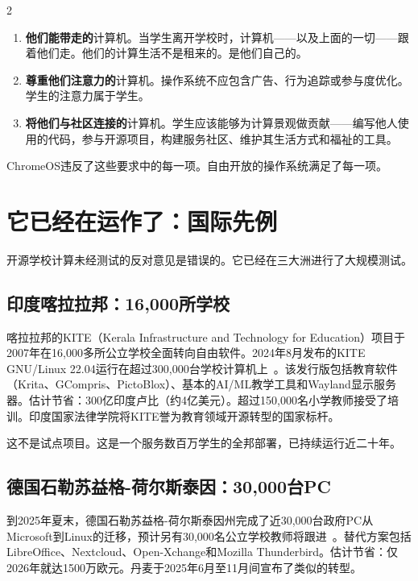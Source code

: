 \documentclass[11pt, a4paper]{article}
\begin{document}
\begin{multicols}{2}
\begin{enumerate}
  \item \textbf{他们能带走的}计算机。当学生离开学校时，计算机——以及上面的一切——跟着他们走。他们的计算生活不是租来的。是他们自己的。

  \item \textbf{尊重他们注意力的}计算机。操作系统不应包含广告、行为追踪或参与度优化。学生的注意力属于学生。

  \item \textbf{将他们与社区连接的}计算机。学生应该能够为计算景观做贡献——编写他人使用的代码，参与开源项目，构建服务社区、维护其生活方式和福祉的工具。
\end{enumerate}

ChromeOS违反了这些要求中的每一项。自由开放的操作系统满足了每一项。


\section{它已经在运作了：国际先例}

开源学校计算未经测试的反对意见是错误的。它已经在三大洲进行了大规模测试。

\subsection{印度喀拉拉邦：16,000所学校}

喀拉拉邦的KITE（Kerala Infrastructure and Technology for Education）项目于2007年在16,000多所公立学校全面转向自由软件。2024年8月发布的KITE GNU/Linux 22.04运行在超过300,000台学校计算机上~\citep{kite2024gnulinux}。该发行版包括教育软件（Krita、GCompris、PictoBlox）、基本的AI/ML教学工具和Wayland显示服务器。估计节省：300亿印度卢比（约4亿美元）。超过150,000名小学教师接受了培训。印度国家法律学院将KITE誉为教育领域开源转型的国家标杆。

这不是试点项目。这是一个服务数百万学生的全邦部署，已持续运行近二十年。

\subsection{德国石勒苏益格-荷尔斯泰因：30,000台PC}

到2025年夏末，德国石勒苏益格-荷尔斯泰因州完成了近30,000台政府PC从Microsoft到Linux的迁移，预计另有30,000名公立学校教师将跟进~\citep{schleswig2025linux}。替代方案包括LibreOffice、Nextcloud、Open-Xchange和Mozilla Thunderbird。估计节省：仅2026年就达1500万欧元。丹麦于2025年6月至11月间宣布了类似的转型。


\end{multicols}
\end{document}
